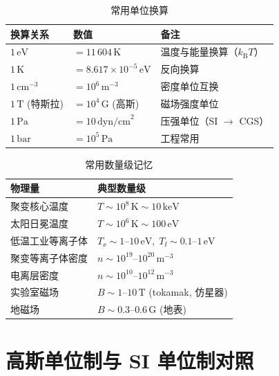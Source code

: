 \begin{table}[htbp]
\centering
\caption{常用单位换算}
\begin{tabular}{@{}lll@{}}
\toprule
\textbf{换算关系} & \textbf{数值} & \textbf{备注} \\
\midrule
$1\,\mathrm{eV}$ & $= 11\,604\,\mathrm{K}$ & 温度与能量换算（$k_\mathrm{B} T$） \\
$1\,\mathrm{K}$ & $= 8.617\times 10^{-5}\,\mathrm{eV}$ & 反向换算 \\
\midrule
$1\,\mathrm{cm}^{-3}$ & $= 10^{6}\,\mathrm{m}^{-3}$ & 密度单位互换 \\
$1\,\mathrm{T}$ (特斯拉) & $= 10^{4}\,\mathrm{G}$ (高斯) & 磁场强度单位 \\
\midrule
$1\,\mathrm{Pa}$ & $= 10\,\mathrm{dyn/cm}^2$ & 压强单位（SI $\to$ CGS） \\
$1\,\mathrm{bar}$ & $= 10^{5}\,\mathrm{Pa}$ & 工程常用 \\
\bottomrule
\end{tabular}
\end{table}

\begin{table}[htbp]
\centering
\caption{常用数量级记忆}
\begin{tabular}{@{}ll@{}}
\toprule
\textbf{物理量} & \textbf{典型数量级} \\
\midrule
聚变核心温度 & $T\sim 10^8\,\mathrm{K}\sim 10\,\mathrm{keV}$ \\
太阳日冕温度 & $T\sim 10^6\,\mathrm{K}\sim 100\,\mathrm{eV}$ \\
低温工业等离子体 & $T_\ee\sim 1\text{--}10\,\mathrm{eV},\; T_\ii\sim 0.1\text{--}1\,\mathrm{eV}$ \\
聚变等离子体密度 & $n\sim 10^{19}\text{--}10^{20}\,\mathrm{m}^{-3}$ \\
电离层密度 & $n\sim 10^{10}\text{--}10^{12}\,\mathrm{m}^{-3}$ \\
实验室磁场 & $B\sim 1\text{--}10\,\mathrm{T}$ (tokamak, 仿星器) \\
地磁场 & $B\sim 0.3\text{--}0.6\,\mathrm{G}$ (地表) \\
\bottomrule
\end{tabular}
\end{table}


\section*{高斯单位制与 SI 单位制对照}

